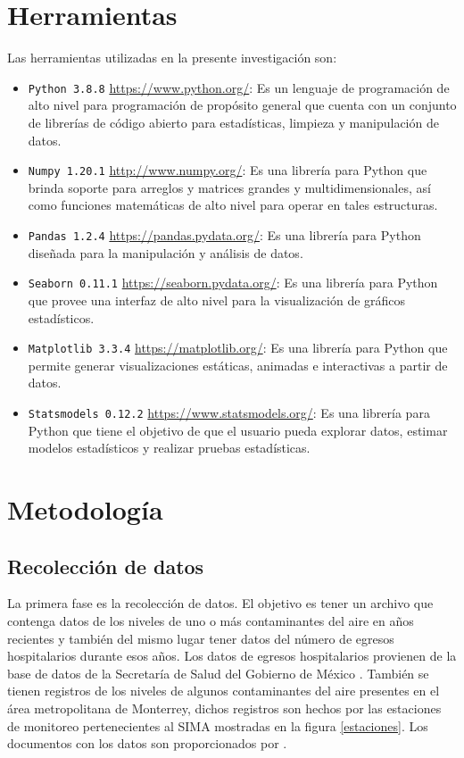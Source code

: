 \section{Herramientas}
Las herramientas utilizadas en la presente investigación son:
\begin{itemize}
	\item \texttt{Python 3.8.8} \url{https://www.python.org/}: Es un lenguaje de programación de alto nivel para programación de propósito general que cuenta con un conjunto de librerías de código abierto para estadísticas, limpieza y manipulación de datos.
	\item \texttt{Numpy 1.20.1} \url{http://www.numpy.org/}: Es una librería para Python que brinda soporte para arreglos y matrices grandes y multidimensionales, así como funciones matemáticas de alto nivel para operar en tales estructuras.  
	\item \texttt{Pandas 1.2.4} \url{https://pandas.pydata.org/}: Es una librería para Python diseñada para la manipulación y análisis de datos.
	\item \texttt{Seaborn 0.11.1} \url{https://seaborn.pydata.org/}: Es una librería para Python que provee una interfaz de alto nivel para la visualización de gráficos estadísticos.
	\item \texttt{Matplotlib 3.3.4} \url{https://matplotlib.org/}: Es una librería para Python que permite generar visualizaciones estáticas, animadas e interactivas a partir de datos.
	\item \texttt{Statsmodels 0.12.2} \url{https://www.statsmodels.org/}: Es una librería para Python que tiene el objetivo de que el usuario pueda explorar datos, estimar modelos estadísticos y realizar pruebas estadísticas.
\end{itemize}

\section{Metodología}

\subsection{Recolección de datos}
La primera fase es la recolección de datos. El objetivo es tener un archivo que contenga datos de los niveles de uno o más  contaminantes del aire en años recientes y también del mismo lugar tener datos del número de egresos hospitalarios durante esos años. Los datos de egresos hospitalarios provienen de la base de datos de la Secretaría de Salud del Gobierno de México \cite{f1}. También se tienen registros de los niveles de algunos contaminantes del aire presentes en el área metropolitana de Monterrey, dichos registros son hechos por las estaciones de monitoreo pertenecientes al SIMA \cite{f2} mostradas en la figura \ref{estaciones}. Los documentos con los datos son proporcionados por \citeauthor{f3}.

